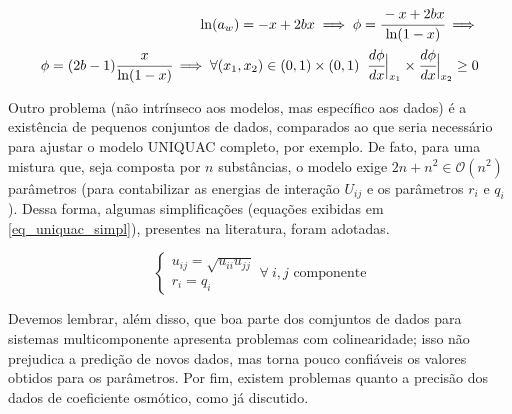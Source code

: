 \documentclass[
	12pt,				%
	openright,
	twoside,
	a4paper,			%
	english,			%
	french,				%
	spanish,			%
	brazil				%
	]{abntex2}
\begin{document}
\begin{equation}
	\label{eq_phi_virial_mono_frac}
	\begin{split}
		\ln(a_w) = -x + 2bx \implies \phi =
			\cfrac{-x + 2bx}{\ln(1-x)}\implies\\
		\phi = (2b-1)\cfrac{x}{\ln(1-x)} \implies
			\forall (x_1,x_2) \in (0,1)\times(0,1)\;\;
			\cfrac{d\phi}{dx}\Big|_{x_1} \times
			\cfrac{d\phi}{dx}\Big|_{x_2} \ge 0
	\end{split}
\end{equation}

Outro problema (não intrínseco aos modelos, mas específico aos dados) é a
existência de pequenos conjuntos de dados, comparados ao que seria
necessário para ajustar o modelo UNIQUAC completo, por exemplo. De fato,
para uma mistura que, seja composta por $n$ substâncias, o modelo exige
$2n+n^2 \in \mathcal{O}(n^2)$ parâmetros (para contabilizar as energias de
interação $U_{ij}$ e os parâmetros $r_i$ e $q_i$). Dessa forma, algumas
simplificações (equações exibidas em \ref{eq_uniquac_simpl}), presentes
na literatura, foram adotadas.

\begin{equation}
	\label{eq_uniquac_simpl}
	\begin{cases}
		u_{ij} = \sqrt{u_{ii}u_{jj}}\\
		r_i = q_i
	\end{cases}\forall\ i, j\text{ componente}
\end{equation}

Devemos lembrar, além disso, que boa parte dos comjuntos de dados para sistemas
multicomponente apresenta problemas com colinearidade; isso não prejudica a
predição de novos dados, mas torna pouco confiáveis os valores obtidos para os
parâmetros. Por fim, existem problemas quanto a precisão dos dados de coeficiente
osmótico, como já discutido.
\end{document}
